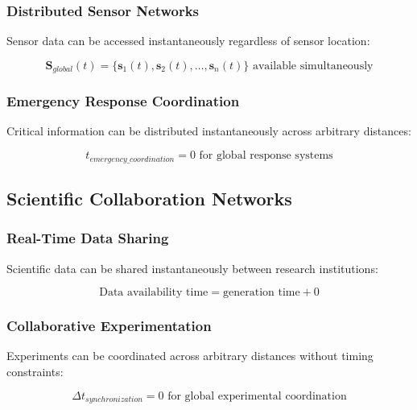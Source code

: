 \documentclass[12pt,a4paper]{article}
\begin{document}
\subsubsection{Distributed Sensor Networks}

Sensor data can be accessed instantaneously regardless of sensor location:

\begin{equation}
\mathbf{S}_{global}(t) = \{\mathbf{s}_1(t), \mathbf{s}_2(t), \ldots, \mathbf{s}_n(t)\} \text{ available simultaneously}
\label{eq:global_sensor_data}
\end{equation}

\subsubsection{Emergency Response Coordination}

Critical information can be distributed instantaneously across arbitrary distances:

\begin{equation}
t_{emergency\_coordination} = 0 \text{ for global response systems}
\label{eq:instant_emergency_response}
\end{equation}

\subsection{Scientific Collaboration Networks}

\subsubsection{Real-Time Data Sharing}

Scientific data can be shared instantaneously between research institutions:

\begin{equation}
\text{Data availability time} = \text{generation time} + 0
\label{eq:instant_data_sharing}
\end{equation}

\subsubsection{Collaborative Experimentation}

Experiments can be coordinated across arbitrary distances without timing constraints:

\begin{equation}
\Delta t_{synchronization} = 0 \text{ for global experimental coordination}
\label{eq:perfect_experimental_sync}
\end{equation}
\end{document}

